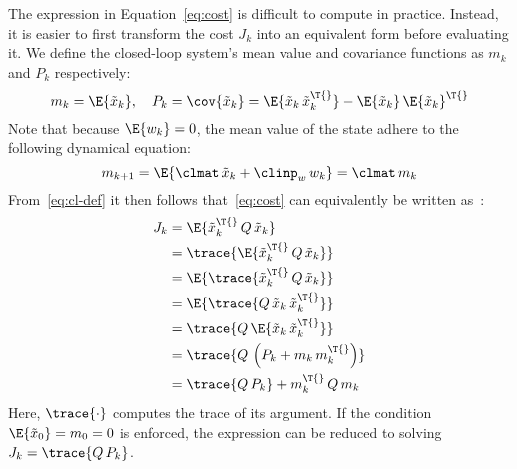 The expression in Equation~\eqref{eq:cost} is difficult to compute in practice.
Instead, it is easier to first transform the cost $J_k$ into an equivalent form before evaluating it.
We define the closed-loop system's mean value and covariance functions as $m_k$ and $P_k$ respectively:
%
\begin{equation}%
    \label{eq:cl-def}%
    m_k = \E{\tilde{x}_k}, \quad P_k = \cov{\tilde{x}_k} = \E{\tilde{x}_k\, \tilde{x}_k^\T{}} - \E{\tilde{x}_k}\,\E{\tilde{x}_k}^\T{}
\end{equation}
%
Note that because $\E{w_k} = 0$, the mean value of the state adhere to the following dynamical equation:
%
\begin{equation*}%
    m_{k+1} = \E{\clmat\,\tilde{x}_k + \clinp_w\,w_k} = \clmat\, m_k
\end{equation*}
%
From~\eqref{eq:cl-def} it then follows that~\eqref{eq:cost} can equivalently be written as~\cite{Bates:2011}:
%
\begin{equation}%
    \label{eq:tr-cost}%
    \begin{aligned}
        J_k &= \E{\tilde{x}_k^\T{}\, Q\, \tilde{x}_k} \\
        &= \trace{\E{\tilde{x}_k^\T{}\, Q\, \tilde{x}_k}} \\
        &= \E{\trace{\tilde{x}_k^\T{}\, Q\, \tilde{x}_k}} \\
        &= \E{\trace{Q\, \tilde{x}_k\, \tilde{x}_k^\T{}}} \\
        &= \trace{Q\, \E{\tilde{x}_k\,\tilde{x}_k^\T{}}} \\
        &= \trace{Q\, \left( P_k + m_k\,m_k^\T{} \right)} \\
        &= \trace{Q\, P_k} + m_k^\T{}\, Q\, m_k
    \end{aligned}
\end{equation}
%
Here, $\trace{\cdot}$ computes the trace of its argument.
If the condition $\E{\tilde{x}_0} = m_0 = 0$ is enforced, the expression can be reduced to solving $J_k = \trace{Q\, P_k}$.

